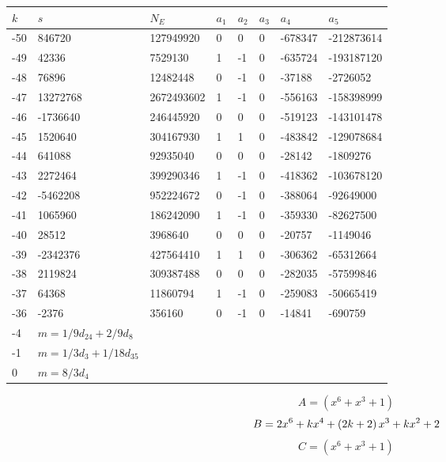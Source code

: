 \documentclass{amsart}
\begin{document}
\begin{longtable}{|l|l|l|lllll|}
\hline
$k$ & $s$ & $N_E$ & $a_1$ & $a_2$ & $a_3$ & $a_4$ & $a_5$\\
\hline
-50&846720&127949920&0&0&0&-678347&-212873614\\
-49&42336&7529130&1&-1&0&-635724&-193187120\\
-48&76896&12482448&0&-1&0&-37188&-2726052\\
-47&13272768&2672493602&1&-1&0&-556163&-158398999\\
-46&-1736640&246445920&0&0&0&-519123&-143101478\\
-45&1520640&304167930&1&1&0&-483842&-129078684\\
-44&641088&92935040&0&0&0&-28142&-1809276\\
-43&2272464&399290346&1&-1&0&-418362&-103678120\\
-42&-5462208&952224672&0&-1&0&-388064&-92649000\\
-41&1065960&186242090&1&-1&0&-359330&-82627500\\
-40&28512&3968640&0&0&0&-20757&-1149046\\
-39&-2342376&427564410&1&1&0&-306362&-65312664\\
-38&2119824&309387488&0&0&0&-282035&-57599846\\
-37&64368&11860794&1&-1&0&-259083&-50665419\\
-36&-2376&356160&0&-1&0&-14841&-690759\\
-4&$m=1/9d_{24}+2/9d_{8}$&&\multicolumn{5}{c|}{}\\
-1&$m=1/3d_{3}+1/18d_{35}$&&\multicolumn{5}{c|}{}\\
0&$m=8/3d_{4}$&&\multicolumn{5}{c|}{}\\
\hline
\end{longtable}
$$A=(x^6
 + x^3
 + 1)$$
$$B=2\*x^6
 + k\*x^4
 + \left(2\*k
 + 2\right) \*x^3
 + k\*x^2
 + 2$$
$$C=(x^6
 + x^3
 + 1)$$
\end{document}
